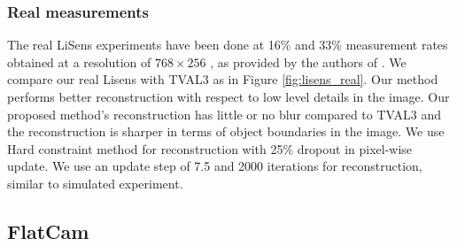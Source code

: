 \documentclass[journal,twoside]{IEEEtran}
\begin{document}
\subsubsection{Real measurements}
 The real LiSens experiments have been done at 16\% and 33\% measurement rates obtained at a resolution of $768\times256$ , as provided by the authors of \cite{wang2015lisens}. We compare our real Lisens with TVAL3 as in Figure \ref{fig:lisens_real}. Our method performs better reconstruction with respect to low level details in the image. Our proposed method’s reconstruction has little or no blur compared to TVAL3 and the reconstruction is sharper in terms of object boundaries in the image. We use Hard constraint method for reconstruction with 25\% dropout in pixel-wise update. We use an update step of 7.5 and 2000 iterations for reconstruction, similar to simulated experiment. 

\subsection{FlatCam}
\end{document}
